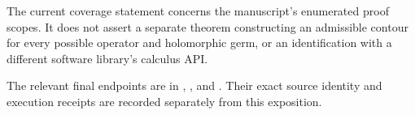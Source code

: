 The current coverage statement concerns the manuscript's enumerated proof scopes. It does not assert a separate theorem constructing an admissible contour for every possible operator and holomorphic germ, or an identification with a different software library's calculus API.

The relevant final endpoints are in , , and . Their exact source identity and execution receipts are recorded separately from this exposition.
